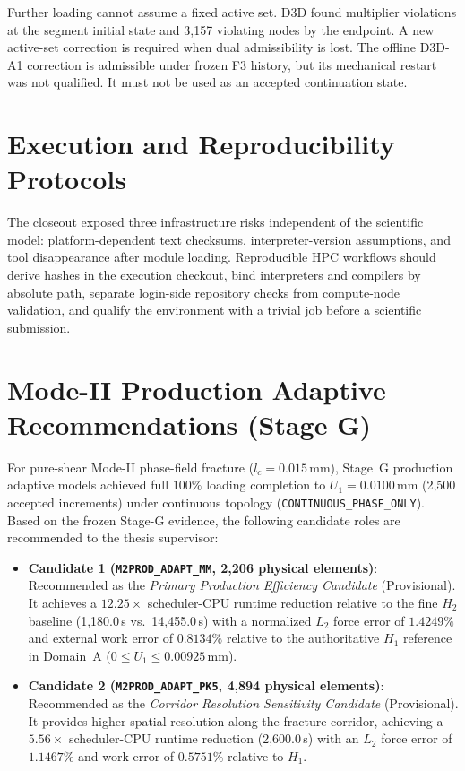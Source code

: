 Further loading cannot assume a fixed active set. D3D found multiplier
violations at the segment initial state and 3,157 violating nodes by the
endpoint. A new active-set correction is required when dual admissibility is
lost. The offline D3D-A1 correction is admissible under frozen F3 history, but
its mechanical restart was not qualified. It must not be used as an accepted
continuation state.

\section{Execution and Reproducibility Protocols}

The closeout exposed three infrastructure risks independent of the scientific
model: platform-dependent text checksums, interpreter-version assumptions, and
tool disappearance after module loading. Reproducible HPC workflows should
derive hashes in the execution checkout, bind interpreters and compilers by
absolute path, separate login-side repository checks from compute-node
validation, and qualify the environment with a trivial job before a scientific
submission.

\section{Mode-II Production Adaptive Recommendations (Stage G)}

For pure-shear Mode-II phase-field fracture (\(l_c=0.015\,\mathrm{mm}\)), Stage~G
production adaptive models achieved full $100\%$ loading completion to
$U_1 = 0.0100\,\mathrm{mm}$ (2,500 accepted increments) under continuous topology
(\texttt{CONTINUOUS\_PHASE\_ONLY}). Based on the frozen Stage-G evidence, the
following candidate roles are recommended to the thesis supervisor:

\begin{itemize}
    \item \textbf{Candidate 1 (\texttt{M2PROD\_ADAPT\_MM}, 2,206 physical elements)}:
    Recommended as the \emph{Primary Production Efficiency Candidate} (Provisional). It achieves a $12.25\times$ scheduler-CPU runtime reduction relative to the fine $H_2$ baseline (1,180.0\,s vs.\ 14,455.0\,s) with a normalized $L_2$ force error of $1.4249\%$ and external work error of $0.8134\%$ relative to the authoritative $H_1$ reference in Domain~A ($0 \le U_1 \le 0.00925\,\mathrm{mm}$).
    
    \item \textbf{Candidate 2 (\texttt{M2PROD\_ADAPT\_PK5}, 4,894 physical elements)}:
    Recommended as the \emph{Corridor Resolution Sensitivity Candidate} (Provisional). It provides higher spatial resolution along the fracture corridor, achieving a $5.56\times$ scheduler-CPU runtime reduction (2,600.0\,s) with an $L_2$ force error of $1.1467\%$ and work error of $0.5751\%$ relative to $H_1$.
\end{itemize}

